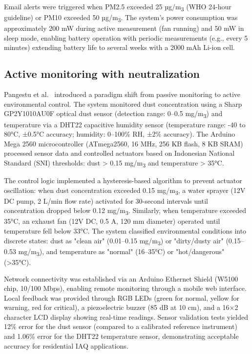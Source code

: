 \documentclass[12pt]{report}
\begin{document}
Email alerts were triggered when PM2.5 exceeded 25 µg/m\textsubscript{3} (WHO 24-hour guideline) or PM10 exceeded 50 µg/m\textsubscript{3}. The system's power consumption was approximately 200 mW during active measurement (fan running) and 50 mW in sleep mode, enabling battery operation with periodic measurements (e.g., every 5 minutes) extending battery life to several weeks with a 2000 mAh Li-ion cell.

\subsection{Active monitoring with neutralization}
Pangestu et al.~\cite{pangestu2020} introduced a paradigm shift from passive monitoring to active environmental control. The system monitored dust concentration using a Sharp GP2Y1010AU0F optical dust sensor (detection range: 0--0.5 mg/m\textsubscript{3}) and temperature via a DHT22 capacitive humidity sensor (temperature range: -40 to 80°C, ±0.5°C accuracy; humidity: 0--100\% RH, ±2\% accuracy). The Arduino Mega 2560 microcontroller (ATmega2560, 16 MHz, 256 KB flash, 8 KB SRAM) processed sensor data and controlled actuators based on Indonesian National Standard (SNI) thresholds: dust > 0.15 mg/m\textsubscript{3} and temperature > 35°C.

The control logic implemented a hysteresis-based algorithm to prevent actuator oscillation: when dust concentration exceeded 0.15 mg/m\textsubscript{3}, a water sprayer (12V DC pump, 2 L/min flow rate) activated for 30-second intervals until concentration dropped below 0.12 mg/m\textsubscript{3}. Similarly, when temperature exceeded 35°C, an exhaust fan (12V DC, 0.5 A, 120 mm diameter) operated until temperature fell below 33°C. The system classified environmental conditions into discrete states: dust as "clean air" (0.01--0.15 mg/m\textsubscript{3}) or "dirty/dusty air" (0.15--0.53 mg/m\textsubscript{3}), and temperature as "normal" (16--35°C) or "hot/dangerous" (>35°C).

Network connectivity was established via an Arduino Ethernet Shield (W5100 chip, 10/100 Mbps), enabling remote monitoring through a mobile web interface. Local feedback was provided through RGB LEDs (green for normal, yellow for warning, red for critical), a piezoelectric buzzer (85 dB at 10 cm), and a 16×2 character LCD display showing real-time readings. Sensor validation tests yielded 12\% error for the dust sensor (compared to a calibrated reference instrument) and 1.06\% error for the DHT22 temperature sensor, demonstrating acceptable accuracy for residential IAQ applications.
\end{document}
